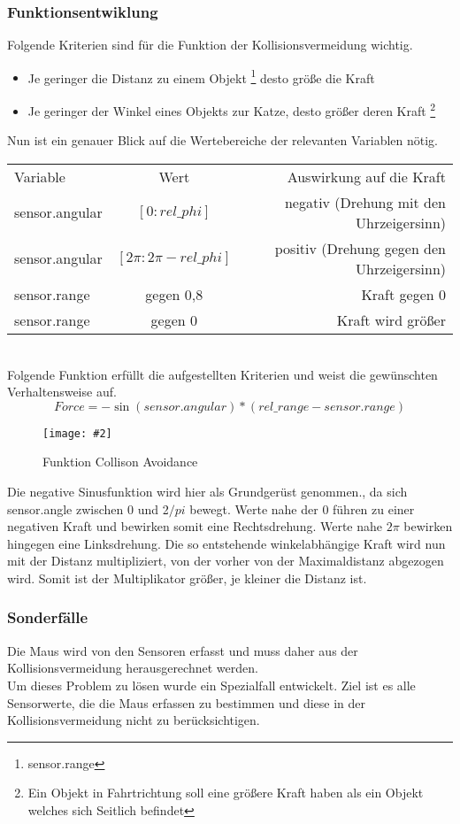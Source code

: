 \documentclass[
a4paper,     %
12pt         %
]{scrartcl}  %
\newcommand{\mygraphics}[3]{
\begin{figure}[!h]
  \begin{center}
    \texttt{[image: \#2]} \\
    \caption{#3}\label{fig:#2}
  \end{center}
\end{figure}

}
\begin{document}
\subsubsection{Funktionsentwiklung}
\label{collision}
Folgende Kriterien sind für die Funktion der Kollisionsvermeidung wichtig.
\begin{itemize}
\item Je geringer die Distanz zu einem Objekt \footnote {sensor.range} desto größe die Kraft
\item Je geringer der Winkel eines Objekts zur Katze, desto größer deren Kraft \footnote{Ein Objekt in Fahrtrichtung soll eine größere Kraft haben als ein Objekt welches sich Seitlich befindet}
\end{itemize}
Nun ist ein genauer Blick auf die Wertebereiche der relevanten Variablen nötig.\\
 \begin{tabular}[h]{lcr}
 Variable & Wert & Auswirkung auf die Kraft \\
 sensor.angular & $[0 : rel\_phi]$ & negativ (Drehung mit den Uhrzeigersinn) \\
 sensor.angular & $[2\pi : 2\pi-rel\_phi]$ & positiv (Drehung gegen den Uhrzeigersinn) \\
 sensor.range & gegen 0,8  & Kraft gegen 0 \\
 sensor.range & gegen 0 & Kraft wird größer \\
 \end{tabular}
\\
Folgende Funktion erfüllt die aufgestellten Kriterien und weist die gewünschten Verhaltensweise auf.
\[ Force= -\sin(sensor.angular) * (rel\_range-sensor.range) \]
\mygraphics{0.7\textwidth}{Kollision.png}{Funktion Collison Avoidance}
Die negative Sinusfunktion wird hier als Grundgerüst genommen., da sich sensor.angle zwischen 0 und 2$/pi$ bewegt. Werte nahe der 0 führen zu einer negativen Kraft und bewirken somit eine Rechtsdrehung. Werte nahe $2\pi $ bewirken hingegen eine Linksdrehung. Die so entstehende winkelabhängige Kraft wird  nun mit der Distanz multipliziert, von der vorher von der Maximaldistanz abgezogen wird. Somit ist der Multiplikator größer, je kleiner die Distanz ist.
\subsubsection{Sonderfälle}
Die Maus wird von den Sensoren erfasst und muss daher aus der Kollisionsvermeidung herausgerechnet werden.\\
Um dieses Problem zu lösen wurde ein Spezialfall entwickelt.
Ziel ist es alle Sensorwerte, die die Maus erfassen zu bestimmen und diese in der Kollisionsvermeidung nicht  zu berücksichtigen. \\
\end{document}

